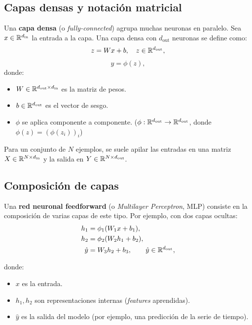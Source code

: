 \subsection{Capas densas y notación matricial}

Una \textbf{capa densa} (o \textit{fully-connected}) agrupa muchas neuronas en paralelo. Sea $x \in \mathbb{R}^{d_{\text{in}}}$ la entrada a la capa. Una capa densa con $d_{\text{out}}$ neuronas se define como:
\begin{equation}
    z = W x + b, \quad z \in \mathbb{R}^{d_{\text{out}}},
\end{equation}
\begin{equation}
    y = \phi(z),
\end{equation}
donde:
\begin{itemize}
    \item $W \in \mathbb{R}^{d_{\text{out}} \times d_{\text{in}}}$ es la matriz de pesos.
    \item $b \in \mathbb{R}^{d_{\text{out}}}$ es el vector de sesgo.
    \item $\phi$ se aplica componente a componente. ($\phi: \mathbb{R}^{d_{\text{out}}} \to \mathbb{R}^{d_{\text{out}}}$, donde $\phi(z)=(\phi(z_i))_i$)
\end{itemize}

Para un conjunto de $N$ ejemplos, se suele apilar las entradas en una matriz $X \in \mathbb{R}^{N \times d_{\text{in}}}$ y la salida en $Y \in \mathbb{R}^{N \times d_{\text{out}}}$.

\subsection{Composición de capas}

Una \textbf{red neuronal feedforward} (o \textit{Multilayer Perceptron}, MLP) consiste en la composición de varias capas de este tipo. Por ejemplo, con dos capas ocultas:
\begin{align}
    h_1 &= \phi_1(W_1 x + b_1), \\
    h_2 &= \phi_2(W_2 h_1 + b_2), \\
    \hat{y} &= W_3 h_2 + b_3, \qquad \hat{y} \in \mathbb{R}^{d_{\text{out}}},
\end{align}

donde:
\begin{itemize}
    \item $x$ es la entrada.
    \item $h_1, h_2$ son representaciones internas (\textit{features} aprendidas).
    \item $\hat{y}$ es la salida del modelo (por ejemplo, una predicción de la serie de tiempo).
\end{itemize}

